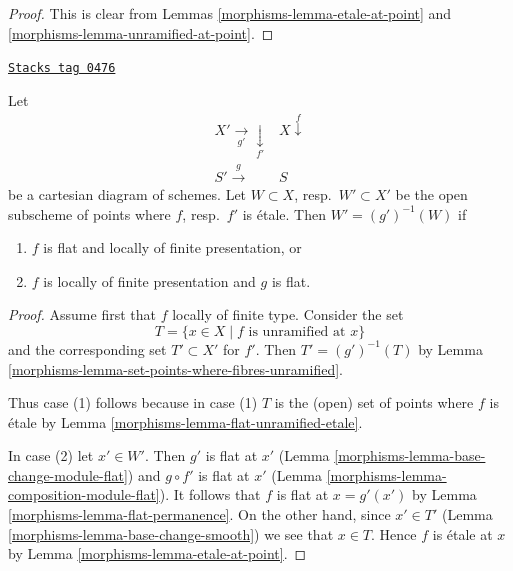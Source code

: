 \begin{proof}

This is clear from Lemmas \ref{morphisms-lemma-etale-at-point}
and \ref{morphisms-lemma-unramified-at-point}.
\end{proof}

\begin{lemma}
\label{morphisms-lemma-set-points-where-fibres-etale}
\href{https://stacks.math.columbia.edu/tag/0476}{\texttt{Stacks tag 0476}}

Let
$$
\begin{array}{cc}X' \underset{g'}{\longrightarrow}\underset{f'}{\downarrow} & X \overset{f}{\downarrow} \\ S' \overset{g}{\longrightarrow} & S\end{array}
$$
be a cartesian diagram of schemes. Let $W \subset X$, resp.\ $W' \subset X'$
be the open subscheme of points where $f$, resp.\ $f'$ is \'etale.
Then $W' = (g')^{-1}(W)$ if
\begin{enumerate}
\item $f$ is flat and locally of finite presentation, or
\item $f$ is locally of finite presentation and $g$ is flat.
\end{enumerate}
\end{lemma}

\begin{proof}

Assume first that $f$ locally of finite type. Consider the set
$$
T = \{x \in X \mid f\text{ is unramified at }x\}
$$
and the corresponding set $T' \subset X'$ for $f'$. Then
$T' = (g')^{-1}(T)$ by
Lemma \ref{morphisms-lemma-set-points-where-fibres-unramified}.

\medskip\noindent
Thus case (1) follows because in case (1) $T$ is the (open) set of points
where $f$ is \'etale by Lemma \ref{morphisms-lemma-flat-unramified-etale}.

\medskip\noindent
In case (2) let $x' \in W'$. Then $g'$ is flat at $x'$
(Lemma \ref{morphisms-lemma-base-change-module-flat}) and
$g \circ f'$ is flat at $x'$ (Lemma \ref{morphisms-lemma-composition-module-flat}).
It follows that $f$ is flat at $x = g'(x')$
by Lemma \ref{morphisms-lemma-flat-permanence}. On the other hand, since
$x' \in T'$ (Lemma \ref{morphisms-lemma-base-change-smooth})
we see that $x \in T$. Hence $f$ is \'etale at $x$ by
Lemma \ref{morphisms-lemma-etale-at-point}.
\end{proof}

